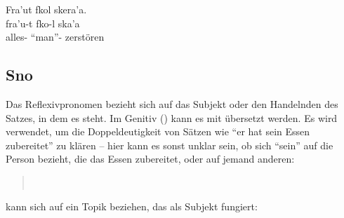 \begin{interlin}
	\glll Fra'ut fkol skera'a. \\
	fra'u-t fko-l ska'a \\
	alles- ``man''- zerstören \\
\end{interlin}

\subsection{Sno} 
Das Reflexivpronomen  bezieht sich auf das Subjekt oder den Handelnden des Satzes, in dem es steht. Im Genitiv () kann es mit  übersetzt werden. Es wird verwendet, um die Doppeldeutigkeit von Sätzen wie ``er hat sein Essen zubereitet'' zu klären -- hier kann es sonst unklar sein, ob sich ``sein'' auf die Person bezieht, die das Essen zubereitet, oder auf jemand anderen:

\begin{quotation}
	\noindent{} \\
	\noindent{} 
\end{quotation}

\noindent {} kann sich auf ein Topik beziehen, das als Subjekt fungiert:

\begin{quotation}
	\noindent{} 
\end{quotation}

%


